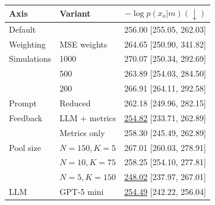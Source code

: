 \begin{table}[ht]
\centering
\caption{}
\setlength{\tabcolsep}{0pt}
\begin{tabular}{llr}
\toprule
Axis & Variant&$-\log p(x_o|m) (\downarrow)$\\
\midrule
Default&&256.00 {\scriptsize [255.05, 262.03]}\\
\midrule
Weighting&MSE weights&264.65 {\scriptsize [250.90, 341.82]}\\
\midrule
Simulations&1000&270.07 {\scriptsize [250.34, 292.69]}\\
&500&263.89 {\scriptsize [254.03, 284.50]}\\
&200&266.91 {\scriptsize [264.11, 292.58]}\\
\midrule
Prompt&Reduced&262.18 {\scriptsize [249.96, 282.15]}\\
\midrule
Feedback&LLM + metrics&\underline{254.82} {\scriptsize [233.71, 262.89]}\\
&Metrics only &258.30 {\scriptsize [245.49, 262.89]}\\
\midrule
Pool size&$N=150,K=5$&267.01 {\scriptsize [260.03, 278.91]}\\
&$N=10,K=75$&258.25 {\scriptsize [254.10, 277.81]}\\
&$N=5,K=150$&\underline{248.02} {\scriptsize [237.97, 267.01]}\\
\midrule
LLM&GPT-5 mini&\underline{254.49} {\scriptsize [242.22, 256.04]}\\
\bottomrule
\end{tabular}
\end{table}